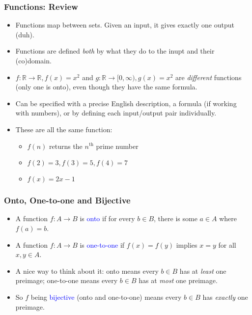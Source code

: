 \documentclass{beamer}
\begin{document}
\begin{frame}
  \frametitle{Functions: Review}
  \begin{itemize}[<+->]
    \item Functions map between sets. Given an input, it gives exactly one output (duh).
    \item Functions are defined \textit{both} by what they do to the inupt and their (co)domain.
    \item $f: \mathbb{R} \to \mathbb{R}, f(x) = x^2$ and $g: \mathbb{R} \to [0, \infty), g(x) = x^2$ are \emph{different} functions (only one is onto), even though they have the same formula.
    \item Can be specified with a precise English description, a formula (if working with numbers), or by defining each input/output pair individually. 
    \item These are all the same function:
    \begin{itemize}
      \setlength\itemsep{1em}
      \item {} $f(n)$ returns the $n^\text{th}$ prime number
      \item {} $f(2) = 3, f(3) = 5, f(4) = 7$
      \item {} $f(x) = 2x - 1$
    \end{itemize}
  \end{itemize}
\end{frame}

\begin{frame}
  \frametitle{Onto, One-to-one and Bijective}
  \begin{itemize}[<+->]
    \item A function $f: A \to B$ is \textcolor{blue}{onto} if for every $b \in B$, there is some $a \in A$ where $f(a) = b$.
    \item A function $f: A \to B$ is \textcolor{blue}{one-to-one} if $f(x) = f(y)$ implies $x = y$ for all $x, y \in A$.
    \item A nice way to think about it: onto means every $b \in B$ has at \textit{least} one preimage; one-to-one means every $b \in B$ has at \textit{most} one preimage.
    \item So $f$ being \textcolor{blue}{bijective} (onto and one-to-one) means every $b \in B$ has \textit{exactly} one preimage.
  \end{itemize}
\end{frame}
\end{document}
